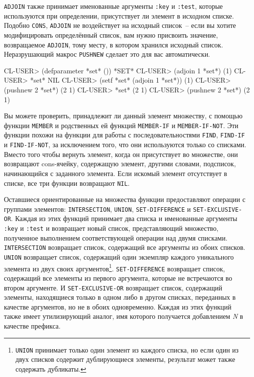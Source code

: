 \lstinline{ADJOIN} также принимает именованные аргументы \lstinline{:key} и \lstinline{:test}, которые
используются при определении, присутствует ли элемент в исходном списке. Подобно
\lstinline{CONS}, \lstinline{ADJOIN} не воздействует на исходный список~-- если вы хотите
модифицировать определённый список, вам нужно присвоить значение, возвращаемое
\lstinline{ADJOIN}, тому месту, в котором хранился исходный список. Неразрушающий макрос
\lstinline{PUSHNEW} сделает это для вас автоматически.

\begin{myverb}
CL-USER> (defparameter *set* ())
*SET*
CL-USER> (adjoin 1 *set*)
(1)
CL-USER> *set*
NIL
CL-USER> (setf *set* (adjoin 1 *set*))
(1)
CL-USER> (pushnew 2 *set*)
(2 1)
CL-USER> *set*
(2 1)
CL-USER> (pushnew 2 *set*)
(2 1)
\end{myverb}

Вы можете проверить, принадлежит ли данный элемент множеству, с помощью функции
\lstinline{MEMBER} и родственных ей функций \lstinline{MEMBER-IF} и \lstinline{MEMBER-IF-NOT}. Эти
функции похожи на функции для работы с последовательностями \lstinline{FIND}, \lstinline{FIND-IF}
и \lstinline{FIND-IF-NOT}, за исключением того, что они используются только со списками. Вместо
того чтобы вернуть элемент, когда он присутствует во множестве, они возвращают cons-ячейку,
содержащую элемент, другими словами, подсписок, начинающийся с заданного элемента. Если
искомый элемент отсутствует в списке, все три функции возвращают \lstinline{NIL}.

Оставшиеся ориентированные на множества функции предоставляют операции с группами
элементов: \lstinline{INTERSECTION}, \lstinline{UNION}, \lstinline{SET-DIFFERENCE} и
\lstinline{SET-EXCLUSIVE-OR}.  Каждая из этих функций принимает два списка и именованные
аргументы \lstinline{:key} и \lstinline{:test} и возвращает новый список, представляющий множество,
полученное выполнением соответствующей операции над двумя списками. \lstinline{INTERSECTION}
возвращает список, содержащий все аргументы из обоих списков. \lstinline{UNION} возвращает
список, содержащий один экземпляр каждого уникального элемента из двух своих
аргументов\footnote{\lstinline{UNION} принимает только один элемент из каждого списка, но если
  один из двух списков содержит дублирующиеся элементы, результат может также содержать
  дубликаты.}. \lstinline{SET-DIFFERENCE} возвращает список, содержащий все элементы из первого
аргумента, которые не встречаются во втором аргументе. И \lstinline{SET-EXCLUSIVE-OR}
возвращает список, содержащий элементы, находящиеся только в одном либо в другом списках,
переданных в качестве аргументов, но не в обоих одновременно. Каждая из этих функций также
имеет утилизирующий аналог, имя которого получается добавлением \textit{N} в качестве
префикса.

